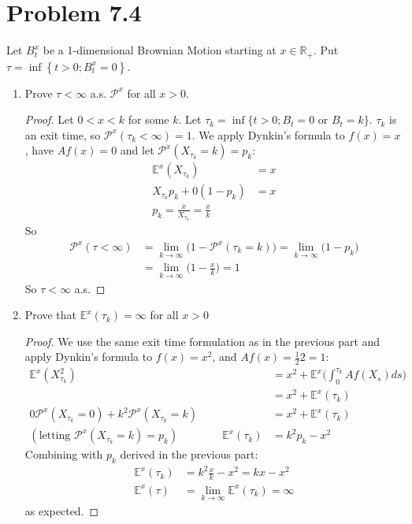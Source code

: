 \documentclass[11pt]{article}
\newcommand{\bbr}{\mathbb{R}}
\renewcommand{\P}{\mathbb{P}}
\renewcommand{\to}{\longrightarrow}
\renewcommand{\P}{\mathcal{P}}
\newcommand{\E}{\mathbb{E}}
\begin{document}
 \section{Problem 7.4}
 Let $B_t^x$ be a 1-dimensional Brownian Motion starting at $x \in \bbr_+$.  Put $\tau = \inf \left\{ t > 0 ; B _ { t } ^ { x } = 0 \right\}$.
 \begin{enumerate}
 \item Prove $\tau < \infty$ a.s. $\P^x$ for all $x>0$.
 \begin{proof} Let $0<x<k$ for some $k$.  Let $\tau_k = \inf\{t>0 ; B_t = 0 \textrm{ or } B_t=k\}$.  $\tau_k$ is an exit time, so $\P^x(\tau_k < \infty) = 1$.   We apply Dynkin's formula to $f(x) = x$, have $Af(x) = 0$ and let $\P^x(X_{\tau_k}=k)=p_k$:
\begin{align*}
\E^x(X_{\tau_k}) &= x\\
X_{\tau_k} p_k + 0 (1-p_k) &=  x\\
p_k = \frac{x}{X_{\tau_k}} = \frac{x}{k}
\end{align*}
So 
\begin{align*}
\P^x( \tau<\infty) &= \lim_{k \to \infty} \Big(1-\P^x(\tau_k = k)\Big) = \lim_{k \to \infty} \Big(1 - p_k\Big)\\
&= \lim_{k \to \infty} \Big( 1-\frac{x}{k}\Big)= 1
\end{align*}
So $\tau<\infty$ a.s.
\end{proof}
\item Prove that $\E^x(\tau_k)= \infty$ for all $x>0$
\begin{proof}
 We use the same exit time formulation as in the previous part and apply Dynkin's formula to $f(x) = x^2$, and $Af(x) = \frac{1}{2} 2 = 1$:
 \begin{align*}
 \E^x (X^2_{\tau_k})&= x^2 + \E^x \Big(\int_0^{\tau_k} Af(X_s) ds \Big)\\
 &=x^2 + \E^x (\tau_k)\\
 0 \P^x(X_{\tau_k}=0)+k^2 \P^x(X_{\tau_k}=k) &= x^2 +  \E^x (\tau_k)\\
(\text{letting $\P^x(X_{\tau_k}=k)=p_k$}) \qquad \qquad \E^x (\tau_k) &= k^2p_k -x^2
 \end{align*}
Combining with $p_k$ derived in the previous part:
\begin{align*}
\E^x(\tau_k) &= k^2 \frac{x}{k}-x^2 = kx-x^2\\
\E^x(\tau) &= \lim_{k \to \infty} \E^x(\tau_k) = \infty
\end{align*}
as expected.
 \end{proof}
 \end{enumerate}
\end{document}

